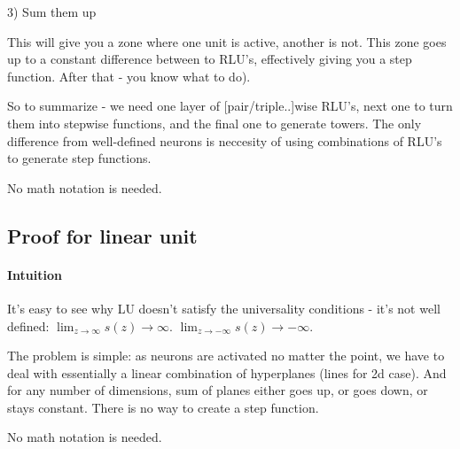 \documentclass{article}
\begin{document}
3) Sum them up

This will give you a zone where one unit is active, another is not. This zone goes up to a constant difference between to RLU's, 
effectively giving you a step function.
After that - you know what to do). 

So to summarize - we need one layer of [pair/triple..]wise RLU's, next one to turn them into stepwise functions, and the final one to generate towers.
The only difference from well-defined neurons is neccesity of using combinations of RLU's to generate step functions.

No math notation is needed.

\subsection{Proof for linear unit}
\paragraph{Intuition}
It's easy to see why LU doesn't satisfy the universality conditions - it's not well defined:
$\lim_{z \rightarrow \infty} s(z) \rightarrow \infty$.
$\lim_{z \rightarrow -\infty} s(z) \rightarrow -\infty$.

The problem is simple: as neurons are activated no matter the point, we have to deal with 
essentially a linear combination of hyperplanes (lines for 2d case). 
And for any number of dimensions, sum of planes either goes up, or goes down, or stays constant. 
There is no way to create a step function.

No math notation is needed.
\end{document}
